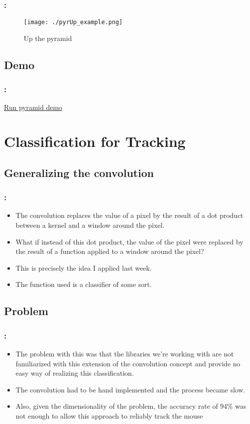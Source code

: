 \documentclass{beamer}
\begin{document}
\begin{frame}
  \frametitle{\secname : \subsecname}
  \begin{figure}
    \centering
    \texttt{[image: ./pyrUp\_example.png]}
    \caption{Up the pyramid}
    \label{fig:pyr_up}
  \end{figure}
\end{frame}


\subsection{Demo}
\begin{frame}
  \frametitle{\secname : \subsecname}
  \href{run:runPyramidDemo.sh}{Run pyramid demo}
\end{frame}

\section{Classification for Tracking}
\subsection{Generalizing the convolution}
\begin{frame}
  \frametitle{\secname : \subsecname}
  \begin{itemize}
      \item The convolution replaces the value of a pixel by the result of a dot product between a kernel and a window
        around the pixel. 
       \item What if instead of this dot product, the value of the pixel were replaced by the result of a function
          applied to a window around the pixel?
       \item This is precisely the idea I applied last week.
       \item The function used is a classifier of some sort. 
  \end{itemize}
\end{frame}

\subsection{Problem}
\begin{frame}
  \frametitle{\secname : \subsecname}
  \begin{itemize}
       \item The problem with this was that the libraries we're working with are not familiarized with this extension of
         the convolution concept and provide no easy way of realizing this classification.
       \item The convolution had to be hand implemented and the process became slow.
       \item Also, given the dimensionality of the problem, the accuracy rate of 94\% was not enough to allow this
         approach to reliably track the mouse
  \end{itemize}
\end{frame}
\end{document}
